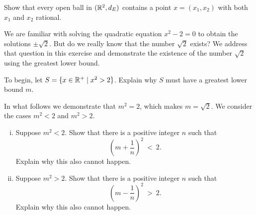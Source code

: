 \item Show that every open ball in $(\mathbb{R}^2,d_E)$ contains a point $x = (x_1,x_2)$ with both $x_1$ and $x_2$ rational.

\begin{comment}

\ExerciseSolution Let $a = (a_1,a_2)$ and $B = B(a,r)$ for some real number $r > 0$.  Let $s = \frac{r}{\sqrt{2}}$. Exercise \ref{ex:GLB_rational} shows that there is a rational number between any two real numbers, so let $x_1$ be a rational number between $a_1$ and $a_1+s$ and let $x_2$ be a rational number between $a_2$ and $a_2+s$. Let $x = (x_1,x_2)$. We will show that $x$ is in $B$. 

By construction we have $|a_1-x_1| < s$ and $|a_2-x_2| < s$. Calculating the distance between $a$ and $x$ gives us 
\begin{align*}
d_E(a,x) &= \sqrt{(a_1-x_1)^2 + (a_2-x_2)^2} \\
	&= \sqrt{|a_1-x_1|^2 + |a_2-x_2|^2} \\
	&< \sqrt{s^2+s^2} \\
	&= \sqrt{\frac{r^2}{2} + \frac{r^2}{2}} \\
	&= \sqrt{r^2} \\
	&= r.
\end{align*}
Since $d_E(a,x) < r$, we have that $x \in B$. 

\end{comment}

\item We are familiar with solving the quadratic equation $x^2-2 = 0$ to obtain the solutions $\pm \sqrt{2}$. But do we really know that the number $\sqrt{2}$ exists? We address that question in this exercise and demonstrate the existence of the number $\sqrt{2}$ using the greatest lower bound. 
\ba

\item To begin, let $S = \{x \in \mathbb{R}^+ \mid x^2 > 2\}$. Explain why $S$ must have a greatest lower bound $m$. 

\item In what follows we demonstrate that $m^2 = 2$, which makes $m = \sqrt{2}$. We consider the cases $m^2 < 2$ and $m^2 > 2$. 
	\begin{enumerate}[i.]
	\item Suppose $m^2 < 2$. Show that there is a positive integer $n$ such that 
	\[\left(m+\frac{1}{n}\right)^2~<~2.\]
	Explain why this also cannot happen.
	
	\item Suppose $m^2 > 2$. Show that there is a positive integer $n$ such that 
	\[\left(m-\frac{1}{n}\right)^2~>~2.\] 
	Explain why this also cannot happen.

	\end{enumerate}

